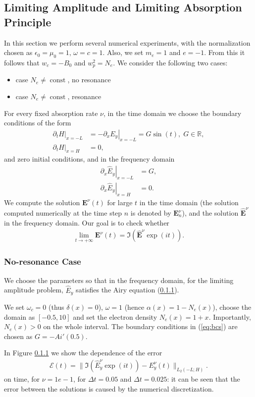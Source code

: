 \documentclass[a4paper,10pt]{article}
\begin{document}
\subsection{Limiting Amplitude and Limiting Absorption Principle}
In this section we perform several numerical experiments,
with the normalization chosen as $\epsilon_0=\mu_0=1$, $\omega=c=1$. 
Also, we set $m_e=1$ and $e=-1$. From this it follows that $w_c=-B_0$ and $w_p^2=N_e$. 
We consider the following two cases:
\begin{itemize}
 \item case $N_e\neq \operatorname{const}$, no resonance
 \item case $N_e\neq \operatorname{const}$, resonance
\end{itemize}
For every fixed absorption rate $\nu$, in the time domain we choose the boundary conditions of the form
\begin{align}
\label{eq:bcs}
\left.\partial_t H\right|_{x=-L}&=-\left.\partial_x E_y\right|_{x=-L}=G\sin(t),\; G\in \mathbb{R}, \\
 \nonumber
 \left.\partial_t H\right|_{x=H}&=0,
\end{align}
and zero initial conditions, and in the frequency domain
\begin{align*}
 \left.\partial_x \hat{E}_y\right|_{x=-L}&=G,\\
 \left.\partial_x \hat{E}_y\right|_{x=H}&=0.
\end{align*}
We compute the solution $\mathbf{E}^{\nu}(t)$ for large $t$ in the time domain (the solution computed numerically at the time step $n$ is denoted by $\mathbf{E}^{\nu}_{n}$), and the solution $\hat{\mathbf{E}}^{\nu}$ in the frequency domain. 
Our goal is to check whether
\begin{align*}
\lim_{t\rightarrow+\infty}\mathbf{E}^{\nu}(t)=\Im\left(\hat{\mathbf{E}}^{\nu}\exp(it)\right).
\end{align*}
 



\subsubsection{No-resonance Case}
We choose the parameters so that in the frequency domain, for the limiting amplitude problem, $\hat{E}_{y}$ satisfies 
the Airy equation (\ref{}). 

We set $\omega_c=0$ (thus $\delta(x)=0$), $\omega=1$ (hence $\alpha(x)=1-N_e(x)$), 
choose the domain as $[-0.5, 10]$ and set the electron density $N_e(x)=1+x$. Importantly, $N_e(x)>0$ on the whole interval.
The boundary conditions in (\ref{eq:bcs}) are chosen as $G=-Ai'(0.5)$. 

In Figure \ref{} we show the dependence of the error 
\begin{align*}
\mathcal{E}(t)=\|\Im\left(\hat{E}_y^{\nu}\exp(it)\right)-E_y^{\nu}(t)\|_{L_{2}(-L;H)}.
\end{align*}
on time, for $\nu=1e-1$, for $\Delta t=0.05$ and $\Delta t=0.025$: it can be seen that the error between the solutions is caused by the numerical discretization. 

\begin{figure}

\end{figure}
\end{document}
